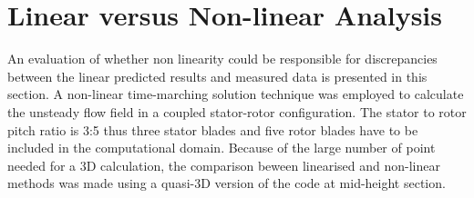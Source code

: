 %
%
%
%
%
%
\section{Linear versus Non-linear Analysis}
\label{linvnon_rt27.sec}
%
%
 An evaluation of whether non linearity could be responsible for discrepancies
 between the linear predicted results and measured data is presented in this
 section.
 A non-linear time-marching solution technique was employed to calculate the
 unsteady flow field in a coupled stator-rotor configuration. The stator to
 rotor pitch ratio is 3:5 thus three stator blades and five rotor blades have to
 be included in the computational domain.
 Because of the large number of point needed for a 3D calculation,
 the comparison beween linearised and non-linear methods was made using
 a quasi-3D version of the code at mid-height section.
%
%
%
%
